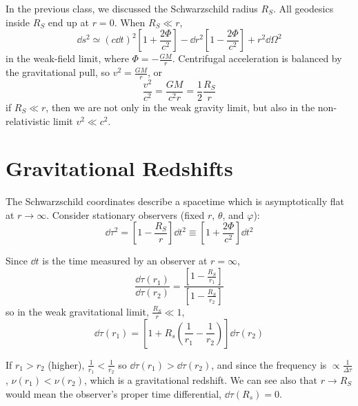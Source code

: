 \documentclass[a4paper,twoside,master.tex]{subfiles}
\begin{document}

In the previous class, we discussed the Schwarzschild radius $ R_S $. All geodesics inside $ R_S $ end up at $ r = 0 $. When $ R_S \ll r $,
\begin{equation}
    \dd{s^2} \simeq (c \dd{t})^2 \left[ 1 + \frac{2 \Phi}{c^2} \right] - \dd{r^2} \left[ 1 - \frac{2 \Phi}{c^2} \right] + r^2 \dd{\Omega^2}
\end{equation}
in the weak-field limit, where $ \Phi = - \frac{GM}{r} $. Centrifugal acceleration is balanced by the gravitational pull, so $ v^2 = \frac{GM}{r} $, or
\begin{equation}
    \frac{v^2}{c^2} = \frac{GM}{c^2 r} = \frac{1}{2} \frac{R_S}{r}
\end{equation}
if $ R_S \ll r $, then we are not only in the weak gravity limit, but also in the non-relativistic limit $ v^2 \ll c^2 $.

\section{Gravitational Redshifts}\label{sec:gravitational_redshifts}

The Schwarzschild coordinates describe a spacetime which is asymptotically flat at $ r \to \infty $. Consider stationary observers (fixed $ r $, $ \theta $, and $ \varphi $):
\begin{equation}
    \dd{\tau^2} = \left[ 1 - \frac{R_S}{r} \right] \dd{t^2} \equiv \left[ 1 + \frac{2 \Phi}{c^2} \right] \dd{t^2}
\end{equation}

Since $ \dd{t} $ is the time measured by an observer at $ r = \infty $,
\begin{equation}
    \frac{\dd{\tau(r_1)}}{\dd{\tau(r_2)}} = \frac{\left[ 1 - \frac{R_S}{r_1} \right]}{\left[ 1 - \frac{R_S}{r_2} \right]}
\end{equation}
so in the weak gravitational limit, $ \frac{R_S}{r} \ll 1 $,
\begin{equation}
    \dd{\tau(r_1)} = \left[ 1 + R_s \left( \frac{1}{r_1} - \frac{1}{r_2} \right) \right] \dd{\tau(r_2)}
\end{equation}

If $ r_1 > r_2 $ (higher), $ \frac{1}{r_1} < \frac{1}{r_2} $ so $ \dd{\tau(r_1)} > \dd{\tau(r_2)} $, and since the frequency is $ \propto \frac{1}{\Delta \tau} $, $ \nu(r_1) < \nu(r_2) $, which is a gravitational redshift. We can see also that $ r \to R_S $ would mean the observer's proper time differential, $ \dd{\tau(R_s)} = 0 $. 
\end{document}
